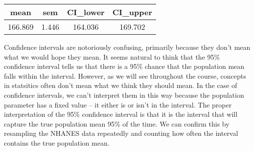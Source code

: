 \documentclass[]{book}
\theoremstyle{definition}
\theoremstyle{definition}
\theoremstyle{definition}
\theoremstyle{remark}
\begin{document}
\begin{longtable}[]{@{}cccc@{}}
\toprule
\begin{minipage}[b]{0.12\columnwidth}\centering\strut
mean\strut
\end{minipage} & \begin{minipage}[b]{0.10\columnwidth}\centering\strut
sem\strut
\end{minipage} & \begin{minipage}[b]{0.14\columnwidth}\centering\strut
CI\_lower\strut
\end{minipage} & \begin{minipage}[b]{0.14\columnwidth}\centering\strut
CI\_upper\strut
\end{minipage}\tabularnewline
\midrule
\endhead
\begin{minipage}[t]{0.12\columnwidth}\centering\strut
166.869\strut
\end{minipage} & \begin{minipage}[t]{0.10\columnwidth}\centering\strut
1.446\strut
\end{minipage} & \begin{minipage}[t]{0.14\columnwidth}\centering\strut
164.036\strut
\end{minipage} & \begin{minipage}[t]{0.14\columnwidth}\centering\strut
169.702\strut
\end{minipage}\tabularnewline
\bottomrule
\end{longtable}

Confidence intervals are notoriously confusing, primarily because they
don't mean what we would hope they mean. It seems natural to think that
the 95\% confidence interval tells us that there is a 95\% chance that
the population mean falls within the interval. However, as we will see
throughout the course, concepts in statsitics often don't mean what we
think they should mean. In the case of confidence intervals, we can't
interpret them in this way because the population parameter has a fixed
value -- it either is or isn't in the interval. The proper
interpretation of the 95\% confidence interval is that it is the
interval that will capture the true population mean 95\% of the time. We
can confirm this by resampling the NHANES data repeatedly and counting
how often the interval contains the true population mean.
\end{document}
